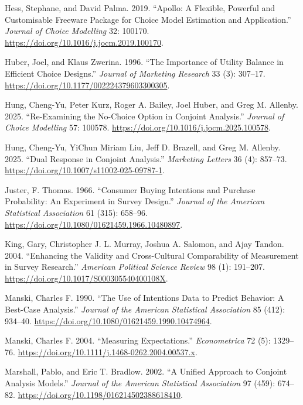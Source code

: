 \documentclass[
  letterpaper,
  DIV=11,
  numbers=noendperiod]{scrartcl}
\newlength{\cslhangindent}
\newenvironment{CSLReferences}[2] %
 {\begin{list}{}{%
  \setlength{\itemindent}{0pt}
  \setlength{\leftmargin}{0pt}
  \setlength{\parsep}{0pt}
  \ifodd #1
   \setlength{\leftmargin}{\cslhangindent}
   \setlength{\itemindent}{-1\cslhangindent}
  \fi
  \setlength{\itemsep}{#2\baselineskip}}}
 {\end{list}}
\theoremstyle{plain}
\theoremstyle{plain}
\theoremstyle{plain}
\theoremstyle{remark}
\begin{document}
\begin{CSLReferences}{1}{1}
Hess, Stephane, and David Palma. 2019. {``Apollo: A Flexible, Powerful
and Customisable Freeware Package for Choice Model Estimation and
Application.''} \emph{Journal of Choice Modelling} 32: 100170.
\url{https://doi.org/10.1016/j.jocm.2019.100170}.

Huber, Joel, and Klaus Zwerina. 1996. {``The Importance of Utility
Balance in Efficient Choice Designs.''} \emph{Journal of Marketing
Research} 33 (3): 307--17.
\url{https://doi.org/10.1177/002224379603300305}.

Hung, Cheng-Yu, Peter Kurz, Roger A. Bailey, Joel Huber, and Greg M.
Allenby. 2025. {``Re-Examining the No-Choice Option in Conjoint
Analysis.''} \emph{Journal of Choice Modelling} 57: 100578.
\url{https://doi.org/10.1016/j.jocm.2025.100578}.

Hung, Cheng-Yu, YiChun Miriam Liu, Jeff D. Brazell, and Greg M. Allenby.
2025. {``Dual Response in Conjoint Analysis.''} \emph{Marketing Letters}
36 (4): 857--73. \url{https://doi.org/10.1007/s11002-025-09787-1}.

Juster, F. Thomas. 1966. {``Consumer Buying Intentions and Purchase
Probability: An Experiment in Survey Design.''} \emph{Journal of the
American Statistical Association} 61 (315): 658--96.
\url{https://doi.org/10.1080/01621459.1966.10480897}.

King, Gary, Christopher J. L. Murray, Joshua A. Salomon, and Ajay
Tandon. 2004. {``Enhancing the Validity and Cross-Cultural Comparability
of Measurement in Survey Research.''} \emph{American Political Science
Review} 98 (1): 191--207.
\url{https://doi.org/10.1017/S000305540400108X}.

Manski, Charles F. 1990. {``The Use of Intentions Data to Predict
Behavior: A Best-Case Analysis.''} \emph{Journal of the American
Statistical Association} 85 (412): 934--40.
\url{https://doi.org/10.1080/01621459.1990.10474964}.

Manski, Charles F. 2004. {``Measuring Expectations.''}
\emph{Econometrica} 72 (5): 1329--76.
\url{https://doi.org/10.1111/j.1468-0262.2004.00537.x}.

Marshall, Pablo, and Eric T. Bradlow. 2002. {``A Unified Approach to
Conjoint Analysis Models.''} \emph{Journal of the American Statistical
Association} 97 (459): 674--82.
\url{https://doi.org/10.1198/016214502388618410}.


\end{CSLReferences}
\end{document}
